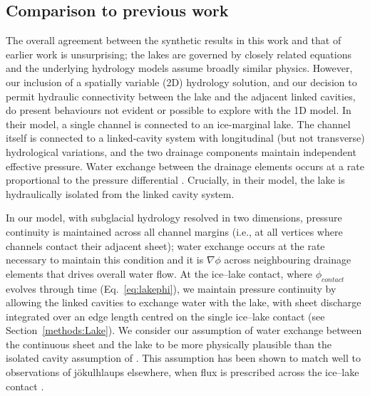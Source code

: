 \documentclass[tc, manuscript]{copernicus}
\begin{document}
\subsection{Comparison to previous work}
The overall agreement between the synthetic results in this work and that of earlier work \citep{kingslake2013modelling} is unsurprising; the lakes are governed by closely related equations and the underlying hydrology models assume broadly similar physics. However, our inclusion of a spatially variable (2D) hydrology solution, and our decision to permit hydraulic connectivity between the lake and the adjacent linked cavities, do present behaviours not evident or possible to explore with the 1D \citet{kingslake2013modelling} model. In their model, a single channel is connected to an ice-marginal lake. The channel itself is connected to a linked-cavity system with longitudinal (but not transverse) hydrological variations, and the two drainage components maintain independent effective pressure. Water exchange between the drainage elements occurs at a rate proportional to the pressure differential \citep[as in][]{hewitt2008seasonal}. Crucially, in their model, the lake is hydraulically isolated from the linked cavity system. 

In our model, with subglacial hydrology resolved in two dimensions, pressure continuity is maintained across all channel margins (i.e., at all vertices where channels contact their adjacent sheet); water exchange occurs at the rate necessary to maintain this condition and it is $\nabla \phi$ across neighbouring drainage elements that drives overall water flow. At the ice--lake contact, where $\phi_{contact}$ evolves through time (Eq.~\ref{eq:lakephi}), we maintain pressure continuity by allowing the linked cavities to exchange water with the lake, with sheet discharge integrated over an edge length centred on the single ice--lake contact (see Section~\ref{methods:Lake}). We consider our assumption of water exchange between the continuous sheet and the lake to be more physically plausible than the isolated cavity assumption of \citet{kingslake2013modelling}. This assumption has been shown to match well to observations of jökulhlaups elsewhere, when flux is prescribed across the ice--lake contact \citep[e.g.,][]{flowers2004coupled}.
\end{document}
